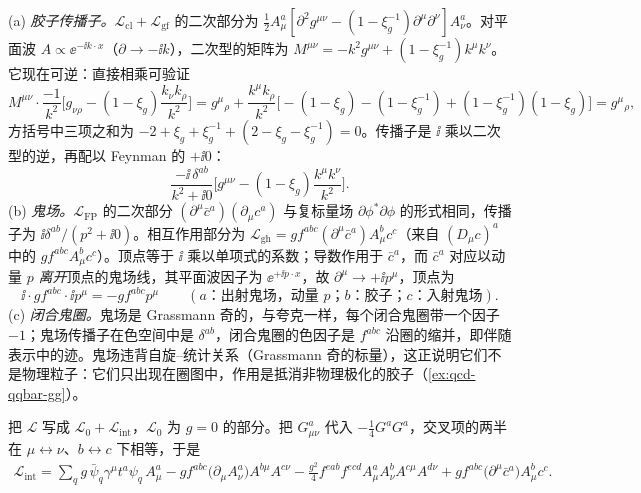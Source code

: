 \begin{example}\label{ex:qcd-fp-lowest-order}
(a) \emph{胶子传播子。}$\mathcal L_{\mathrm{cl}}+\mathcal L_{\mathrm{gf}}$ 的二次部分为 $\frac12A^a_\mu[\partial^2g^{\mu\nu}-(1-\xi_g^{-1})\partial^\mu\partial^\nu]A^a_\nu$。对平面波 $A\propto\ee^{-\ii k\cdot x}$（$\partial\to-\ii k$），二次型的矩阵为 $M^{\mu\nu}=-k^2g^{\mu\nu}+(1-\xi_g^{-1})k^\mu k^\nu$。它现在可逆：直接相乘可验证
\[
M^{\mu\nu}\cdot\frac{-1}{k^2}\Big[g_{\nu\rho}-(1-\xi_g)\frac{k_\nu k_\rho}{k^2}\Big]=g^\mu{}_\rho+\frac{k^\mu k_\rho}{k^2}\Big[-(1-\xi_g)-(1-\xi_g^{-1})+(1-\xi_g^{-1})(1-\xi_g)\Big]=g^\mu{}_\rho ,
\]
方括号中三项之和为 $-2+\xi_g+\xi_g^{-1}+(2-\xi_g-\xi_g^{-1})=0$。传播子是 $\ii$ 乘以二次型的逆，再配以 Feynman 的 $+\ii0$：
\[
\frac{-\ii\,\delta^{ab}}{k^2+\ii0}\Big[g^{\mu\nu}-(1-\xi_g)\frac{k^\mu k^\nu}{k^2}\Big].
\]
(b) \emph{鬼场。}$\mathcal L_{\mathrm{FP}}$ 的二次部分 $(\partial^\mu\bar c^a)(\partial_\mu c^a)$ 与复标量场 $\partial\phi^*\partial\phi$ 的形式相同，传播子为 $\ii\delta^{ab}/(p^2+\ii0)$。相互作用部分为 $\mathcal L_{\mathrm{gh}}=gf^{abc}(\partial^\mu\bar c^a)A^b_\mu c^c$（来自 $(D_\mu c)^a$ 中的 $gf^{abc}A^b_\mu c^c$）。顶点等于 $\ii$ 乘以单项式的系数；导数作用于 $\bar c^a$，而 $\bar c^a$ 对应以动量 $p$ \emph{离开}顶点的鬼场线，其平面波因子为 $\ee^{+\ii p\cdot x}$，故 $\partial^\mu\to+\ii p^\mu$，顶点为
\[
\ii\cdot gf^{abc}\cdot\ii p^\mu=-gf^{abc}p^\mu\qquad(a\text{：出射鬼场，动量 }p\text{；}b\text{：胶子；}c\text{：入射鬼场}).
\]
(c) \emph{闭合鬼圈。}鬼场是 Grassmann 奇的，与夸克一样，每个闭合鬼圈带一个因子 $-1$；鬼场传播子在色空间中是 $\delta^{ab}$，闭合鬼圈的色因子是 $f^{abc}$ 沿圈的缩并，即伴随表示中的迹。鬼场违背自旋--统计关系（Grassmann 奇的标量），这正说明它们不是物理粒子：它们只出现在圈图中，作用是抵消非物理极化的胶子（\cref{ex:qcd-qqbar-gg}）。
\end{example}

把 $\mathcal L$ 写成 $\mathcal L_0+\mathcal L_{\mathrm{int}}$，$\mathcal L_0$ 为 $g=0$ 的部分。把 $G^a_{\mu\nu}$ 代入 $-\frac14G^aG^a$，交叉项的两半在 $\mu\leftrightarrow\nu$、$b\leftrightarrow c$ 下相等，于是
\begin{equation}\label{eq:qcd-Lint}
\begin{gathered}
\mathcal L_{\mathrm{int}}=\sum_qg\,\bar\psi_q\gamma^\mu t^a\psi_q\,A^a_\mu-gf^{abc}\big(\partial_\mu A^a_\nu\big)A^{b\mu}A^{c\nu}-\frac{g^2}4f^{eab}f^{ecd}A^a_\mu A^b_\nu A^{c\mu}A^{d\nu}+gf^{abc}\big(\partial^\mu\bar c^a\big)A^b_\mu c^c .
\end{gathered}
\end{equation}

